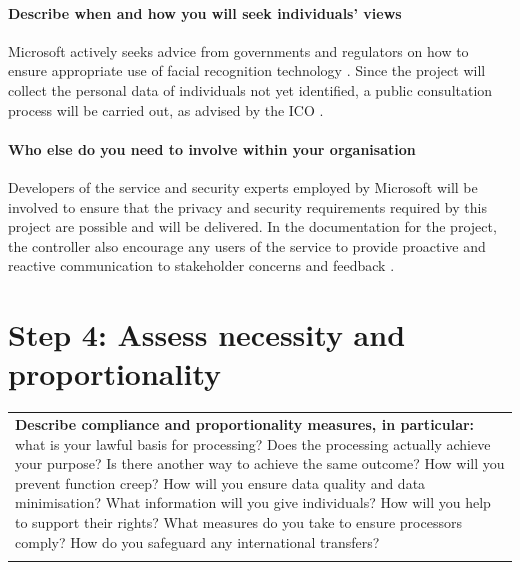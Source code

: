 \documentclass[12pt]{extarticle}
\begin{document}
\paragraph{Describe when and how you will seek individuals' views}
Microsoft actively seeks advice from governments and regulators on how to ensure appropriate use of facial recognition technology \cite{microsoftontheissues_2018}.
Since the project will collect the personal data of individuals not yet identified, a public consultation process will be carried out, as advised by the ICO \cite{icodpia}.

\paragraph{Who else do you need to involve within your organisation}
Developers of the service and security experts employed by Microsoft will be involved to ensure that the privacy and security requirements required by this project are possible and will be delivered.
In the documentation for the project, the controller also encourage any users of the service to provide proactive and reactive communication to stakeholder concerns and feedback \cite{transparencynote}.



\vspace{\baselineskip}
\section*{Step 4: Assess necessity and proportionality}



\begin{table}[H]
 			\centering
\begin{tabular}{p{\linewidth}}
\hline
\multicolumn{1}{|p{\linewidth}|}{\textbf{Describe compliance and proportionality measures, in particular:} what is your lawful basis for processing? Does the processing actually achieve your purpose? Is there another way to achieve the same outcome? How will you prevent function creep? How will you ensure data quality and data minimisation? What information will you give individuals? How will you help to support their rights? What measures do you take to ensure processors comply? How do you safeguard any international transfers?} \\
\hhline{-}
\end{tabular}
 \end{table}
\end{document}
